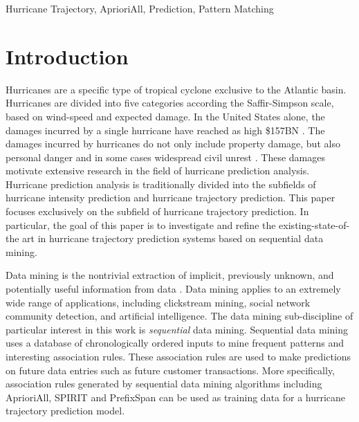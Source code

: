 \documentclass[12pt,conference]{IEEEtran}
\begin{document}
\begin{IEEEkeywords}
Hurricane Trajectory, AprioriAll, Prediction, Pattern Matching
\end{IEEEkeywords}

\IEEEpeerreviewmaketitle

\section{Introduction}

Hurricanes are a specific type of tropical cyclone exclusive to the Atlantic basin. Hurricanes are divided into five categories according the Saffir-Simpson scale, based on wind-speed and expected damage. In the United States alone, the damages incurred by a single hurricane have reached as high \$157BN \cite{hurricane-cost}. The damages incurred by hurricanes do not only include property damage, but also personal danger and in some cases widespread civil unrest \cite{hurricane-cost-non-financial}. These damages motivate extensive research in the field of hurricane prediction analysis. Hurricane prediction analysis is traditionally divided into the subfields of hurricane intensity prediction and hurricane trajectory prediction. This paper focuses exclusively on the subfield of hurricane trajectory prediction. In particular, the goal of this paper is to investigate and refine the existing-state-of-the art in hurricane trajectory prediction systems based on sequential data mining.

Data mining is the nontrivial extraction of implicit, previously unknown, and potentially useful information from data \cite{data mining-def}. Data mining applies to an extremely wide range of applications, including clickstream mining, social network community detection, and artificial intelligence. The data mining sub-discipline of particular interest in this work is \textit{sequential} data mining. Sequential data mining uses a database of chronologically ordered inputs to mine frequent patterns and interesting association rules. These association rules are used to make predictions on future data entries such as future customer transactions. More specifically, association rules generated by sequential data mining algorithms including AprioriAll, SPIRIT and PrefixSpan can be used as training data for a hurricane trajectory prediction model.
\end{document}
